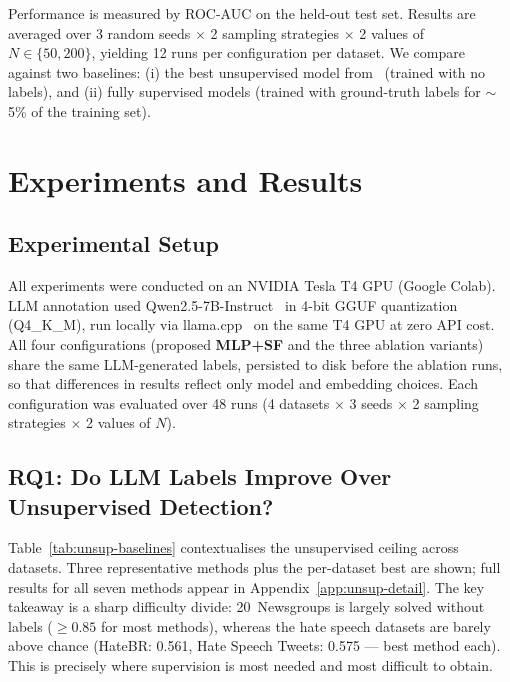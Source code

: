 \documentclass[12pt]{article}
\begin{document}
Performance is measured by ROC-AUC on the held-out test set. 
Results are averaged over 3 random seeds $\times$ 2 sampling 
strategies $\times$ 2 values of $N \in \{50, 200\}$, yielding 12 runs 
per configuration per dataset. We compare against two baselines: 
(i) the best unsupervised model from~\cite{stil} (trained with no labels), 
and (ii) fully supervised models (trained with ground-truth
labels for $\sim$5\% of the training set).


\section{Experiments and Results}

\subsection{Experimental Setup}

All experiments were conducted on an NVIDIA Tesla T4 GPU (Google Colab). 
LLM annotation used Qwen2.5-7B-Instruct~\cite{qwen2025} in 4-bit GGUF
quantization (Q4\_K\_M), run locally via llama.cpp~\cite{llamacpp} on the same
T4 GPU at zero API cost. All four configurations (proposed \textbf{MLP+SF}
and the three ablation variants) share the same LLM-generated labels,
persisted to disk before the ablation runs, so that differences in results
reflect only model and embedding choices.
Each configuration was evaluated over 48 runs 
(4 datasets $\times$ 3 seeds $\times$ 2 sampling strategies $\times$ 2 values of $N$).

\subsection{RQ1: Do LLM Labels Improve Over Unsupervised Detection?}

Table~\ref{tab:unsup-baselines} contextualises the unsupervised ceiling across
datasets. Three representative methods plus the per-dataset best are shown;
full results for all seven methods appear in Appendix~\ref{app:unsup-detail}.
The key takeaway is a sharp difficulty divide: 20~Newsgroups is largely solved
without labels ($\geq 0.85$ for most methods), whereas the hate speech datasets
are barely above chance (HateBR: 0.561, Hate Speech Tweets: 0.575 --- best
method each). This is precisely where supervision is most needed and most
difficult to obtain.
\end{document}
